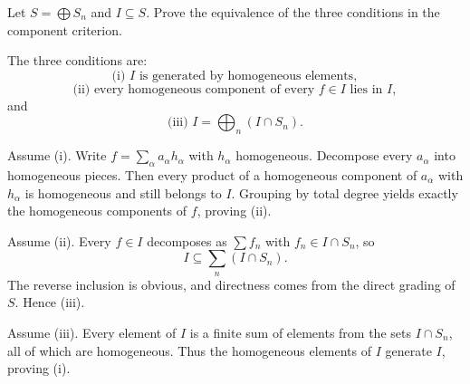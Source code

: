 \begin{problem}\label{prob:vi34-01}
Let \(S=\bigoplus S_n\) and \(I\subseteq S\). Prove the equivalence of the three conditions in the component criterion.
\end{problem}

\ifdefined\FullProblemDossiers
\begin{solution}
The three conditions are:
\[
\text{(i) }I\text{ is generated by homogeneous elements},
\]
\[
\text{(ii) every homogeneous component of every }f\in I\text{ lies in }I,
\]
and
\[
\text{(iii) }I=\bigoplus_n(I\cap S_n).
\]

Assume (i). Write \(f=\sum_\alpha a_\alpha h_\alpha\) with \(h_\alpha\) homogeneous. Decompose every
\(a_\alpha\) into homogeneous pieces. Then every product of a homogeneous component of \(a_\alpha\) with
\(h_\alpha\) is homogeneous and still belongs to \(I\). Grouping by total degree yields exactly the homogeneous
components of \(f\), proving (ii).

Assume (ii). Every \(f\in I\) decomposes as \(\sum f_n\) with \(f_n\in I\cap S_n\), so
\[
I\subseteq\sum_n(I\cap S_n).
\]
The reverse inclusion is obvious, and directness comes from the direct grading of \(S\). Hence (iii).

Assume (iii). Every element of \(I\) is a finite sum of elements from the sets \(I\cap S_n\), all of which are
homogeneous. Thus the homogeneous elements of \(I\) generate \(I\), proving (i).
\end{solution}
\fi
